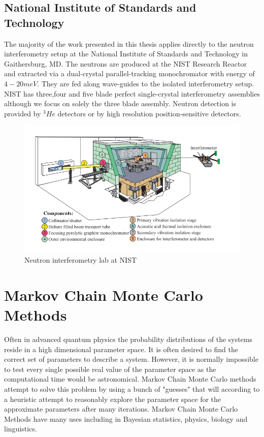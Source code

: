 \subsection{National Institute of Standards and Technology}
The majority of the work presented in this thesis applies directly to the neutron interferometry setup at the National Institute of Standards and Technology in Gaithersburg, MD. The neutrons are produced at the NIST Research Reactor and extracted via a dual-crystal parallel-tracking monochromator with energy of $4-20 meV$. They are fed along wave-guides to the isolated interferometry setup. NIST has three,four and five blade perfect single-crystal interferometry assemblies although we focus on solely the three blade assembly. Neutron detection is provided by $^3He$ detectors or by high resolution position-sensitive detectors.\cite{nist_setup}\cite{nist_powerpoint} 
\begin{figure}[ht!]
\centering
\includegraphics[scale=0.5]{Figures/neutroninterferometer.png}
\caption{Neutron interferometry lab at NIST \cite{dimaThesis}}
\label{fig:neutroninterferometerlab}
\end{figure}
\section{Markov Chain Monte Carlo Methods}
Often in advanced quantum physics the probability distributions of the systems reside in a high dimensional parameter space. It is often desired to find the correct set of parameters to describe a system. However, it is normally impossible to test every single possible real value of the parameter space as the computational time would be astronomical. Markov Chain Monte Carlo methods attempt to solve this problem by using a bunch of "guesses" that will according to a heuristic attempt to reasonably explore the parameter space for the approximate parameters after many iterations.  Markov Chain Monte Carlo Methods have many uses including in Bayesian statistics, physics, biology and linguistics.\cite{mcmc}

